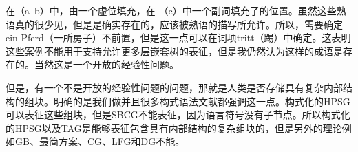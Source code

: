 \zl
在（a--b）中，\vfc 由一个虚位填充，在 （c）中一个副词填充了\vfc 的位置。虽然这些熟语真的很少见，但是是确实存在的，应该被熟语的描写所允许。所以，需要确定ein Pferd（一所房子）不前置，但是这一点可以在词项tritt（踢）中确定。这表明这些案例不能用于支持允许更多层嵌套树的表征，但是我仍然认为这样的成语是存在的。当然这是一个开放的经验性问题。

但是，有一个不是开放的经验性问题的问题，那就是人类是否存储具有复杂内部结构的组块。明确的是我们做并且很多构式语法文献都强调这一点。构式化的HPSG可以表征这些组块，但是SBCG不能表征，因为语言符号没有子节点。所以构式化的HPSG以及TAG是能够表征包含具有内部结构的复杂组块的，但是另外的理论例如GB、最简方案、CG、LFG和DG不能。



  
